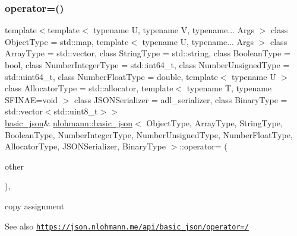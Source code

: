 \subsubsection{\texorpdfstring{operator=()}{operator=()}}
{\footnotesize\ttfamily template$<$template$<$ typename U, typename V, typename... Args $>$ class Object\+Type = std\+::map, template$<$ typename U, typename... Args $>$ class Array\+Type = std\+::vector, class String\+Type  = std\+::string, class Boolean\+Type  = bool, class Number\+Integer\+Type  = std\+::int64\+\_\+t, class Number\+Unsigned\+Type  = std\+::uint64\+\_\+t, class Number\+Float\+Type  = double, template$<$ typename U $>$ class Allocator\+Type = std\+::allocator, template$<$ typename T, typename S\+F\+I\+N\+A\+E=void $>$ class J\+S\+O\+N\+Serializer = adl\+\_\+serializer, class Binary\+Type  = std\+::vector$<$std\+::uint8\+\_\+t$>$$>$ \\
\hyperlink{classnlohmann_1_1basic__json}{basic\+\_\+json}\& \hyperlink{classnlohmann_1_1basic__json}{nlohmann\+::basic\+\_\+json}$<$ Object\+Type, Array\+Type, String\+Type, Boolean\+Type, Number\+Integer\+Type, Number\+Unsigned\+Type, Number\+Float\+Type, Allocator\+Type, J\+S\+O\+N\+Serializer, Binary\+Type $>$\+::operator= (\begin{DoxyParamCaption}\item[{\hyperlink{classnlohmann_1_1basic__json}{basic\+\_\+json}$<$ Object\+Type, Array\+Type, String\+Type, Boolean\+Type, Number\+Integer\+Type, Number\+Unsigned\+Type, Number\+Float\+Type, Allocator\+Type, J\+S\+O\+N\+Serializer, Binary\+Type $>$}]{other }\end{DoxyParamCaption})\hspace{0.3cm}{\ttfamily [inline]}, {\ttfamily [noexcept]}}



copy assignment 

\begin{DoxySeeAlso}{See also}
\href{https://json.nlohmann.me/api/basic_json/operator=/}{\tt https\+://json.\+nlohmann.\+me/api/basic\+\_\+json/operator=/} 
\end{DoxySeeAlso}
\mbox{\label{classnlohmann_1_1basic__json_a9ea67fc1ef0ccc42e1d5388fe0416ae5}} 
